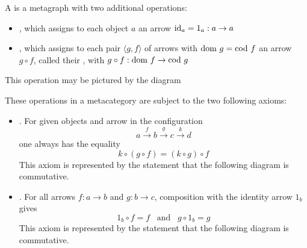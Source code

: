 \documentclass[11pt,letterpaper]{jacky}
\begin{document}
\begin{defi}
    A  is a metagraph with two additional operations:
    \begin{itemize}
        \item {}, which assigns to each object $a$ an arrow
            $\text{id}_{a}=1_a:a\rightarrow a$
        \item {}, which assigns to each pair $\langle g,f
            \rangle$ of arrows with $\text{dom }g=\text{cod }f$ an arrow $g\circ f$,
            called their , with $g\circ
            f:\text{dom }f\rightarrow\text{cod }g$
    \end{itemize}
    This operation may be pictured by the diagram
    \begin{center}
    \end{center}
    These operations in a metacategory are subject to the two following axioms:
    \begin{itemize}
        \item {}. For given objects and arrow in the
            configuration
            \[a\xrightarrow{f}b\xrightarrow{g}c\xrightarrow{k}d\]
            one always has the equality
            \[k\circ\left(g\circ f\right)=\left(k\circ g\right)\circ f\]
            This axiom is represented by the statement that the following
            diagram is commutative.
            \begin{center}
            \end{center}
        \item {}. For all arrows $f:a\rightarrow b$ and
            $g:b\rightarrow c$, composition with the identity arrow $1_b$ gives
            \[1_b\circ f=f\hspace{10pt}\text{and}\hspace{10pt}g\circ1_b=g\]
            This axiom is represented by the statement that the following
            diagram is commutative.
            \begin{center}
            \end{center}
    \end{itemize}
\end{defi}
\end{document}
